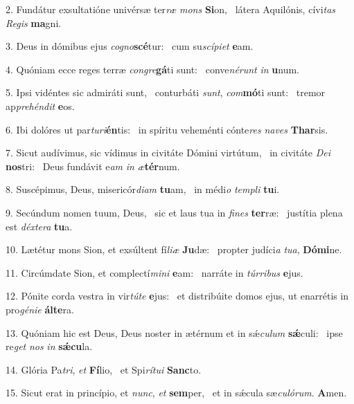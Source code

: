 2. Fundátur exsultatióne univérsæ ter\textit{ræ} \textit{mons} \textbf{Si}on, \ast\  látera Aquilónis, cívi\textit{tas} \textit{Re}\textit{gis} \textbf{ma}gni.\

3. Deus in dómibus ejus \textit{co}\textit{gno}\textbf{scé}tur: \ast\  cum su\textit{scí}\textit{pi}\textit{et} \textbf{e}am.\

4. Quóniam ecce reges terræ \textit{con}\textit{gre}\textbf{gá}ti sunt: \ast\  conve\textit{né}\textit{runt} \textit{in} \textbf{u}num.\

5. Ipsi vidéntes sic admiráti sunt, \dag\  conturbáti \textit{sunt}, \textit{com}\textbf{mó}ti sunt: \ast\  tremor ap\textit{pre}\textit{hén}\textit{dit} \textbf{e}os.\

6. Ibi dolóres ut par\textit{tu}\textit{ri}\textbf{én}tis: \ast\  in spíritu veheménti cónte\textit{res} \textit{na}\textit{ves} \textbf{Thar}sis.\

7. Sicut audívimus, sic vídimus in civitáte Dómini virtútum, \dag\  in civitáte \textit{De}\textit{i} \textbf{nos}tri: \ast\  Deus fundávit e\textit{am} \textit{in} \textit{æ}\textbf{tér}num.\

8. Suscépimus, Deus, misericór\textit{di}\textit{am} \textbf{tu}am, \ast\  in médi\textit{o} \textit{tem}\textit{pli} \textbf{tu}i.\

9. Secúndum nomen tuum, Deus, \dag\  sic et laus tua in \textit{fi}\textit{nes} \textbf{ter}ræ: \ast\  justítia plena est \textit{déx}\textit{te}\textit{ra} \textbf{tu}a.\

10. Lætétur mons Sion, et exsúltent fí\textit{li}\textit{æ} \textbf{Ju}dæ: \ast\  propter judíci\textit{a} \textit{tu}\textit{a}, \textbf{Dó}\textbf{mi}ne.\

11. Circúmdate Sion, et complectí\textit{mi}\textit{ni} \textbf{e}am: \ast\  narráte in \textit{túr}\textit{ri}\textit{bus} \textbf{e}jus.\

12. Pónite corda vestra in vir\textit{tú}\textit{te} \textbf{e}jus: \ast\  et distribúite domos ejus, ut enarrétis in pro\textit{gé}\textit{ni}\textit{e} \textbf{ál}\textbf{te}ra.\

13. Quóniam hic est Deus, Deus noster in ætérnum et in sǽ\textit{cu}\textit{lum} \textbf{sǽ}culi: \ast\  ipse re\textit{get} \textit{nos} \textit{in} \textbf{sǽ}\textbf{cu}la.\

14. Glória Pa\textit{tri}, \textit{et} \textbf{Fí}lio, \ast\  et Spi\textit{rí}\textit{tu}\textit{i} \textbf{Sanc}to.\

15. Sicut erat in princípio, et \textit{nunc}, \textit{et} \textbf{sem}per, \ast\  et in sǽcula sæ\textit{cu}\textit{ló}\textit{rum}. \textbf{A}men.\

